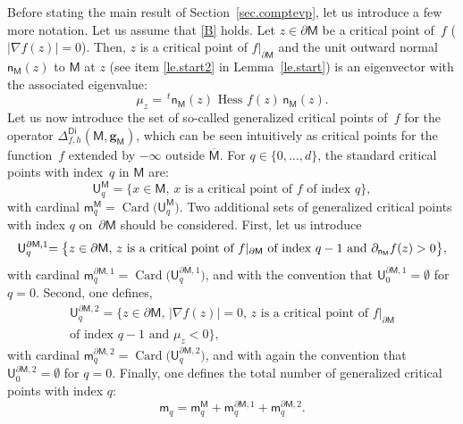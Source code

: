 \documentclass[10pt]{amsart}
\DeclareMathOperator{\Card}{Card}
\newcommand{\mbf}[1]{\mathbf{#1}}
\let\pa\partial
\theoremstyle{plain}
\theoremstyle{definition}
\begin{document}
Before stating the main result of Section~\ref{sec.comptevp}, let us
introduce a few more notation. Let us assume that \hbox{\ref{B}} holds. Let $z\in \pa \mathsf M$ be a critical point of~$f$ (\ie $\vert \nabla f(z)\vert =0$). Then, $z$ is a critical point of $f|_{\pa \mathsf M}$ and
the unit outward normal~$\mathsf n_{\mathsf M}(z)$ to $ \mathsf M$
at $z$ (see item \eqref{le.start2} in Lemma~\ref{le.start}) is an eigenvector with
the associated eigenvalue:
\begin{equation}\label{eq.lambdad}
\mu_z = \,^t \mathsf n_{\mathsf M}(z) \text{ Hess } f(z) \, \mathsf n_{\mathsf M}(z).
\end{equation}
Let us now introduce the set of so-called generalized critical
points of~$f$ for the operator $\Delta_{f,h}^{\mathsf{Di}}(\mathsf
M,\mbf g_{\mathsf M})$, which can be seen intuitively as critical
points for the function~$f$ extended by $-\infty$ outside
$\overline{\mathsf M}$.
For $q\in \{0,\ldots,d\}$, the standard critical points with index~$q$
in $\mathsf M$ are:
\[
\mathsf U_q^{\mathsf M}= \big \{x \in \mathsf M, \, x \text{ is a
critical point of } f \text{ of index } q \big \},
\]
with cardinal $\mathsf m_{q}^{\mathsf M}=\Card\bigl(\mathsf
U_q^{\mathsf M}\bigr)$. Two additional sets of generalized critical
points with index $q$ on~$\partial \mathsf M$ should be considered. First, let us introduce
\begin{equation}\label{eq.PSGENE}
\mathsf U_q^{\pa \mathsf M,1}\hspace*{-1mm}= \big \{z \in \pa \mathsf M, \, z \text{ is a critical point of } f|_{\pa \mathsf M} \text{ of index } q-1 \text{ and } \partial_{\mathsf n_{ \mathsf M}}f(z)>0\big \},
\end{equation}
with cardinal $
\mathsf m_q^{\pa \mathsf M,1}=\Card\bigl (\mathsf U_q^{\pa
\mathsf M,1} \bigr)$, and
with the convention that $
\mathsf U_0^{\pa \mathsf M,1}=\emptyset$
for $q=0$. Second, one defines,
\begin{multline}\label{eq.PS-nouveau}
\mathsf U_q^{\pa \mathsf M,2}=\big \{z \in \pa \mathsf M, \, \vert
\nabla f(z)\vert =0, \, z \text{ is a critical point of } f|_{\pa
\mathsf M}\\
\text{of index } q-1\text{ and }\mu_z <0\big \},
\end{multline}
with cardinal $\mathsf m_q^{\pa \mathsf M,2}=\Card\bigl(\mathsf U_q^{\pa \mathsf M,2}\bigr)$, and with again the convention
that $
\mathsf U_0^{\pa \mathsf M,2}=\emptyset$ for $q=0$.
Finally, one defines the total number
of generalized critical points with index $q$:
\begin{equation}\label{numb-generalize}
\mathsf m_q=\mathsf m_q^{ \mathsf M}+\mathsf m_q^{\pa \mathsf M,1}+\mathsf m_q^{\pa \mathsf M,2}.
\end{equation}
\end{document}
